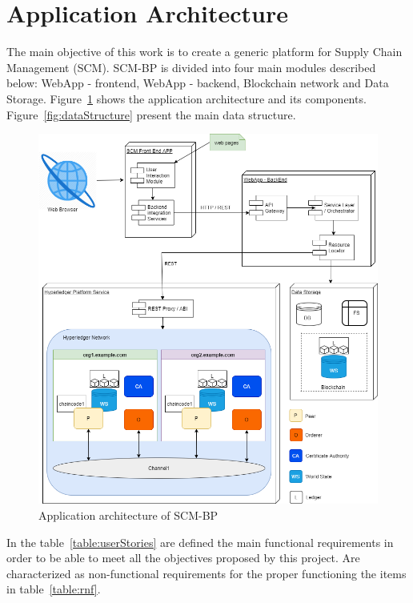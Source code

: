 \section{Application Architecture}\label{sec:applicationArchitecture}

The main objective of this work is to create a generic platform for Supply Chain Management (SCM). \ac{SCM-BP} is divided into four main modules described below: WebApp - frontend, WebApp - backend, Blockchain network and Data Storage. Figure~\ref{fig:detalhamentotecnico} shows the application architecture and its components. Figure~\ref{fig:dataStructure} present the main data structure.

\begin{figure}[htbp]
\begin{center}
  \includegraphics[scale=0.55]{images/architecture.png}
\caption{Application architecture of \ac{SCM-BP}}
\label{fig:detalhamentotecnico}
\end{center}
\end{figure}

In the table~\ref{table:userStories} are defined the main functional requirements in order to be able to meet all the objectives proposed by this project. Are characterized as non-functional requirements for the proper functioning the items in table~\ref{table:rnf}.






